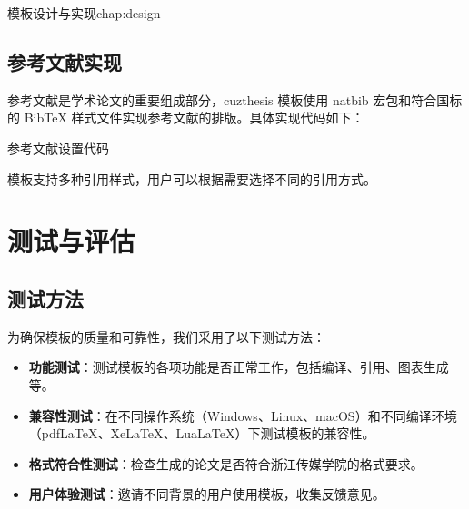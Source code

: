 \begin{cuzchapter}{模板设计与实现}{chap:design}
    \subsection{参考文献实现}

    参考文献是学术论文的重要组成部分，cuzthesis 模板使用 natbib 宏包和符合国标的 BibTeX 样式文件实现参考文献的排版。具体实现代码如下：

    \begin{listing}[htbp]
        \caption{参考文献设置代码}
        \label{code:bibliography}
        \begin{texcode}

            \setlength{\bibsep}{0.5ex}
            \renewcommand{\bibfont}{\small}
        \end{texcode}
    \end{listing}

    模板支持多种引用样式，用户可以根据需要选择不同的引用方式。

    \section{测试与评估}\label{sec:testing-evaluation}

    \subsection{测试方法}

    为确保模板的质量和可靠性，我们采用了以下测试方法：

    \begin{itemize}
        \item \textbf{功能测试}：测试模板的各项功能是否正常工作，包括编译、引用、图表生成等。

        \item \textbf{兼容性测试}：在不同操作系统（Windows、Linux、macOS）和不同编译环境（pdfLaTeX、XeLaTeX、LuaLaTeX）下测试模板的兼容性。

        \item \textbf{格式符合性测试}：检查生成的论文是否符合浙江传媒学院的格式要求。

        \item \textbf{用户体验测试}：邀请不同背景的用户使用模板，收集反馈意见。
    \end{itemize}


\end{cuzchapter}
